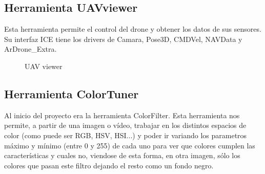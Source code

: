 \subsection{Herramienta UAVviewer}
\hspace{1 cm} Esta herramienta permite el control del drone y obtener los datos de sus sensores. Su interfaz ICE tiene los drivers de Camara, Pose3D, CMDVel, NAVData y ArDrone\_Extra. 

\begin{figure}[H]
 \centering
 \caption{UAV viewer}
 \label{f:UAVViewerTotal}
\end{figure} 


\subsection{Herramienta ColorTuner}
\hspace{1 cm} Al inicio del proyecto era la herramienta ColorFilter. Esta herramienta nos permite, a partir de una imagen o v\'ideo, trabajar en los distintos espacios de color (como puede ser RGB, HSV, HSI...) y poder ir variando los parametros m\'aximo y m\'inimo (entre 0 y 255) de cada uno para ver que colores cumplen las caracter\'isticas y cuales no, viendose de esta forma, en otra imagen, s\'olo los colores que pasan este filtro dejando el resto como un fondo negro. 

